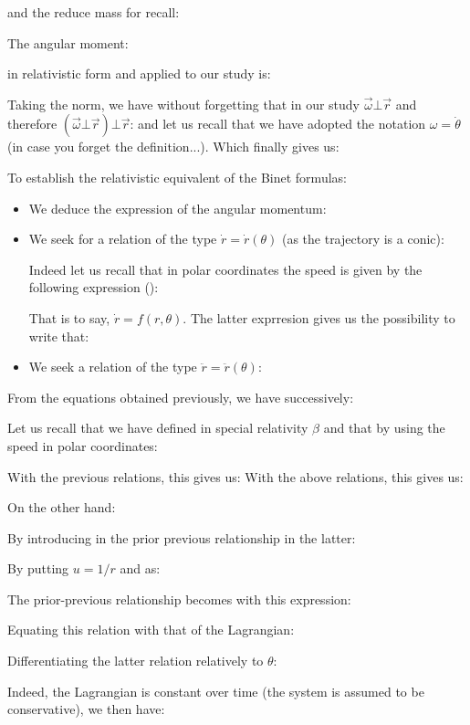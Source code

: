	and the reduce mass for recall:
	
	The angular moment:
	
	in relativistic form and applied to our study is:
	
	Taking the norm, we have without forgetting that in our study $\vec{\omega}\bot\vec{r}$ and therefore $(\vec{\omega}\bot\vec{r})\bot\vec{r}$:
	and let us recall that we have adopted the notation $\omega=\dot{\theta}$ (in case you forget the definition...). Which finally gives us:
	
	To establish the relativistic equivalent of the Binet formulas:
	\begin{itemize}
		\item We deduce the expression of the angular momentum:
		

		\item We seek for a relation of the type $\dot{r}=\dot{r}(\theta)$ (as the trajectory is a conic):
		
		Indeed let us recall that in polar coordinates the speed is given by the following expression ():
		
		That is to say, $\dot{r}=f(r,\theta)$. The latter exprresion gives us the possibility to write that:
		
		
		\item We seek a relation of the type $\ddot{r}=\ddot{r}(\theta)$:
		
	\end{itemize}
	From the equations obtained previously, we have successively:
	
	Let us recall that we have defined in special relativity $\beta$ and that by using the speed in polar coordinates:
	
	With the previous relations, this gives us:
	With the above relations, this gives us:
	
	On the other hand:
	
	By introducing in the prior previous relationship in the latter:
	
	By putting $u=1/r$ and as:
	
	The prior-previous relationship becomes with this expression:
	
	Equating this relation with that of the Lagrangian:
	
	Differentiating the latter relation relatively to $\theta$:
	
	Indeed, the Lagrangian is constant over time (the system is assumed to be conservative), we then have:
	
